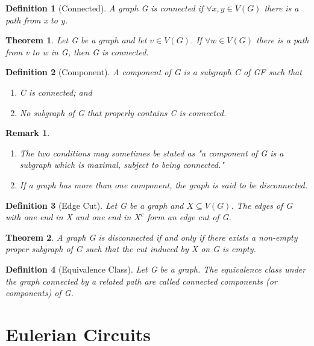 \documentclass[11pt, oneside]{book}
\theoremstyle{break}
\newtheorem{thm}{Theorem}[section]
\newtheorem{defn}{Definition}[section]
\newtheorem*{remark}{Remark}
\begin{document}
\begin{defn}[Connected]
	A graph G is connected if $\forall x, y \in V(G)$ there is a path from x to y.
\end{defn}

\begin{thm}
	Let G be a graph and let $v \in V(G)$. If $\forall w \in V(G)$ there is a path from v to w in G, then G is connected.
\end{thm}

\begin{defn}[Component]
	A component of G is a subgraph C of GF such that\
	\begin{enumerate}
		\item C is connected; and
		\item No subgraph of G that properly contains C is connected.
	\end{enumerate}
\end{defn}

\begin{remark}
	\begin{enumerate}
		\item The two conditions may sometimes be stated as "a component of G is a subgraph which is maximal, subject to being connected."
		\item If a graph has more than one component, the graph is said to be disconnected.
	\end{enumerate}
\end{remark}

\begin{defn}[Edge Cut]
	Let G be a graph and $X \subseteq V(G)$. The edges of G with one end in X and one end in $X^c$ form an edge cut of G.
\end{defn}

\begin{thm}
	A graph G is disconnected if and only if there exists a non-empty proper subgraph of G such that the cut induced by X on G is empty.
\end{thm}

\begin{defn}[Equivalence Class]
	Let G be a graph. The equivalence class under the graph connected by a related path are called connected components (or components) of G.
\end{defn}


\section{Eulerian Circuits}
\end{document}
